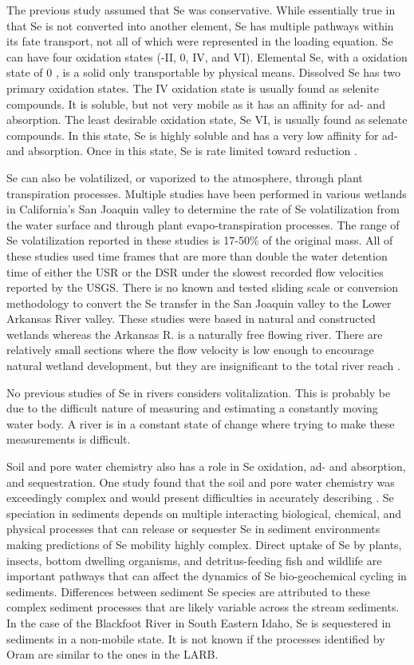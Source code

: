 The previous study assumed that Se was conservative.  While essentially true in that Se is not converted into another element, Se has multiple pathways within its fate transport, not all of which were represented in the loading equation.  Se can have four oxidation states (-II, 0, IV, and VI).  Elemental Se, with a oxidation state of 0 , is a solid only transportable by physical means.  Dissolved Se has two primary oxidation states.  The IV oxidation state is usually found as selenite compounds.  It is soluble, but not very mobile as it has an affinity for ad- and absorption.  The least desirable oxidation state, Se VI, is usually found as selenate compounds.  In this state, Se is highly soluble and has a very low affinity for ad- and absorption.  Once in this state, Se is rate limited toward reduction \citep{Oram2010}.

Se can also be volatilized, or vaporized to the atmosphere, through plant transpiration processes.  Multiple studies have been performed in various wetlands in California's San Joaquin valley to determine the rate of Se volatilization from the water surface and through plant evapo-transpiration processes.  The range of Se volatilization reported in these studies is 17-50\% of the original mass.  All of these studies used time frames that are more than double the water detention time of either the USR or the DSR under the slowest recorded flow velocities reported by the USGS.  There is no known and tested sliding scale or conversion methodology to convert the Se transfer in the San Joaquin valley to the Lower Arkansas River valley.  These studies were based in natural and constructed wetlands whereas the Arkansas R. is a naturally free flowing river.  There are relatively small sections where the flow velocity is low enough to encourage natural wetland development, but they are insignificant to the total river reach \citep{Gersberg2006, Gersberg2009}.

No previous studies of Se in rivers considers volitalization.  This is probably be due to the difficult nature of measuring and estimating a constantly moving water body.  A river is in a constant state of change where trying to make these measurements is difficult.

Soil and pore water chemistry also has a role in Se oxidation, ad- and absorption, and sequestration.  One study found that the soil and pore water chemistry was exceedingly complex and would present difficulties in accurately describing \citep{Oram2008}. Se speciation in sediments depends on multiple interacting biological, chemical, and physical processes that can release or sequester Se in sediment environments making predictions of Se mobility highly complex.  Direct uptake of Se by plants, insects, bottom dwelling organisms, and detritus-feeding fish and wildlife are important pathways that can affect the dynamics of Se bio-geochemical cycling in sediments.  Differences between sediment Se species are attributed to these complex sediment processes that are likely variable across the stream sediments.  In the case of the Blackfoot River in South Eastern Idaho, Se is sequestered in sediments in a non-mobile state.  It is not known if the processes identified by Oram are similar to the ones in the LARB.


